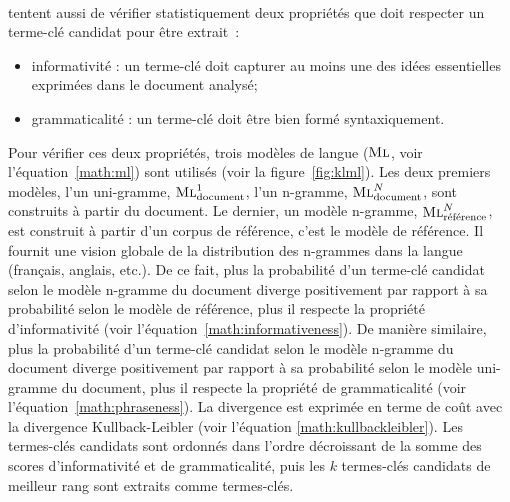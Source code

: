         ~\\ tentent aussi de vérifier
        statistiquement deux propriétés que doit respecter un terme-clé candidat
        pour être extrait~:
        \begin{itemize}
          \item{informativité : un terme-clé doit capturer au moins une des
                idées essentielles exprimées dans le document analysé;}
          \item{grammaticalité : un terme-clé doit être bien formé
                syntaxiquement.}
        \end{itemize}
        Pour vérifier ces deux propriétés, trois modèles de langue
        ($\textsc{Ml}$, voir l'équation~\ref{math:ml}) sont utilisés (voir la
        figure~\ref{fig:klml}). Les deux
        premiers modèles, l'un uni-gramme, $\textsc{Ml}_{\text{document}}^1$,
        l'un n-gramme, $\textsc{Ml}_{\text{document}}^N$, sont construits à
        partir du document. Le dernier, un modèle n-gramme,
        $\textsc{Ml}_{\text{référence}}^N$, est construit à partir d'un corpus
        de référence, c'est le modèle de référence. Il fournit une vision
        globale de la distribution des n-grammes dans la langue (français,
        anglais, etc.). De ce fait, plus la probabilité d'un terme-clé candidat
        selon le modèle n-gramme du document diverge positivement par rapport à
        sa probabilité selon le modèle de référence, plus il respecte la
        propriété d'informativité (voir l'équation~\ref{math:informativeness}). De
        manière similaire, plus la probabilité d'un terme-clé candidat selon le
        modèle n-gramme du document diverge positivement par rapport à sa
        probabilité selon le modèle uni-gramme du document, plus il respecte la
        propriété de grammaticalité (voir l'équation~\ref{math:phraseness}). La
        divergence est exprimée en terme de coût avec la divergence
        Kullback-Leibler (voir l'équation \ref{math:kullbackleibler}). Les
        termes-clés candidats sont ordonnés dans l'ordre décroissant de la somme
        des scores d'informativité et de grammaticalité, puis les $k$
        termes-clés candidats de meilleur rang sont extraits comme termes-clés.
